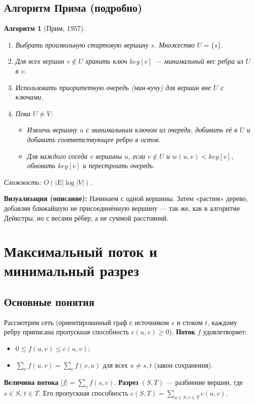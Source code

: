 \documentclass[12pt]{article}
\newtheorem{algorithm}{Алгоритм}
\begin{document}
\begin{enumerate}
\subsection{Алгоритм Прима (подробно)}
\begin{algorithm}[Прим, 1957]
    \begin{enumerate}
        \item Выбрать произвольную стартовую вершину \(s\). Множество \(U = \{s\}\).
        \item Для всех вершин \(v \notin U\) хранить ключ \(key[v]\) — минимальный вес ребра из \(U\) в \(v\).
        \item Использовать приоритетную очередь (мин-кучу) для вершин вне \(U\) с ключами.
        \item Пока \(U \neq V\):
            \begin{itemize}
                \item Извлечь вершину \(u\) с минимальным ключом из очереди, добавить её в \(U\) и добавить соответствующее ребро в остов.
                \item Для каждого соседа \(v\) вершины \(u\), если \(v \notin U\) и \(w(u,v) < key[v]\), обновить \(key[v]\) и перестроить очередь.
            \end{itemize}
    \end{enumerate}
    Сложность: \(O(|E|\log|V|)\).
\end{algorithm}
\textbf{Визуализация (описание):} Начинаем с одной вершины. Затем «растим» дерево, добавляя ближайшую не присоединённую вершину — так же, как в алгоритме Дейкстры, но с весами рёбер, а не суммой расстояний.

\section{Максимальный поток и минимальный разрез}
\subsection{Основные понятия}
Рассмотрим сеть (ориентированный граф с источником \(s\) и стоком \(t\), каждому ребру приписана пропускная способность \(c(u,v) \ge 0\)). \textbf{Поток} \(f\) удовлетворяет:
\begin{itemize}
    \item \(0 \le f(u,v) \le c(u,v)\);
    \item \(\sum_{v} f(u,v) = \sum_{v} f(v,u)\) для всех \(u \neq s,t\) (закон сохранения).
\end{itemize}
\textbf{Величина потока} \(|f| = \sum_{v} f(s,v)\). \textbf{Разрез} \((S,T)\) — разбиение вершин, где \(s \in S\), \(t \in T\). Его пропускная способность \(c(S,T) = \sum_{u \in S, v \in T} c(u,v)\).


\end{enumerate}
\end{document}
